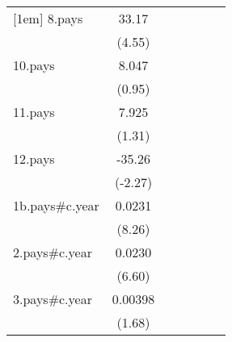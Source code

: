 {\begin{tabular}{l*{6}{c}}
[1em]
8.pays              &       33.17\sym{***}&                     &                     &                     &                     &                     \\
                    &      (4.55)         &                     &                     &                     &                     &                     \\
[1em]
10.pays             &       8.047         &                     &                     &                     &                     &                     \\
                    &      (0.95)         &                     &                     &                     &                     &                     \\
[1em]
11.pays             &       7.925         &                     &                     &                     &                     &                     \\
                    &      (1.31)         &                     &                     &                     &                     &                     \\
[1em]
12.pays             &      -35.26\sym{*}  &                     &                     &                     &                     &                     \\
                    &     (-2.27)         &                     &                     &                     &                     &                     \\
[1em]
1b.pays#c.year      &      0.0231\sym{***}&                     &                     &                     &                     &                     \\
                    &      (8.26)         &                     &                     &                     &                     &                     \\
[1em]
2.pays#c.year       &      0.0230\sym{***}&                     &                     &                     &                     &                     \\
                    &      (6.60)         &                     &                     &                     &                     &                     \\
[1em]
3.pays#c.year       &     0.00398         &                     &                     &                     &                     &                     \\
                    &      (1.68)         &                     &                     &                     &                     &                     \\

\end{tabular}}
